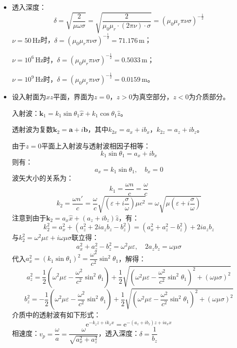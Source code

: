 \documentclass[a4paper,fontset=none]{ctexart}
\begin{document}
\begin{itemize}
    设：
    \[
        \bm{D} = \bm{D}_0\mathrm{e}^{i(\bm{k}\cdot\bm{x}-\omega t)},\quad \bm{E} = \bm{E}_0\mathrm{e}^{i(\bm{k}\cdot\bm{x}-\omega t)}
    \]
    \[
        \bm{B} = \bm{B}_0\mathrm{e}^{i(\bm{k}\cdot\bm{x}-\omega t)},\quad \bm{H} = \bm{H}_0\mathrm{e}^{i(\bm{k}\cdot\bm{x}-\omega t)}
    \]

    \item[7.]
    透入深度：
    \[
        \delta = \sqrt{\frac{2}{\mu\omega\sigma}} = \sqrt{\frac{2}{\mu_0 \mu_r \cdot (2\pi\nu) \cdot \sigma}} = (\mu_0 \mu_r \pi\nu\sigma)^{-\tfrac{1}{2}}
    \]
    $\nu=50\,\mathrm{Hz}$时，$\delta=(\mu_0 \mu_r \pi\nu\sigma)^{-\tfrac{1}{2}}=71.176\,\mathrm{m}$；

    $\nu=10^6\,\mathrm{Hz}$时，$\delta=(\mu_0 \mu_r \pi\nu\sigma)^{-\tfrac{1}{2}}=0.5033\,\mathrm{m}$；

    $\nu=10^9\,\mathrm{Hz}$时，$\delta=(\mu_0 \mu_r \pi\nu\sigma)^{-\tfrac{1}{2}}=0.0159\,\mathrm{m}$。

    \item[8.]
    设入射面为$xz$平面，界面为$z=0$，$z>0$为真空部分，$z<0$为介质部分。

    入射波：$\bm{k}_1=k_1\sin\theta_1\hat{x}+k_1\cos\theta_1\hat{z}$。

    透射波为复数$\bm{k}_2=\bm{a}+i\bm{b}$，其中$k_{2x}=a_x+ib_x$，$k_{2z}=a_z+ib_z$。

    由于$z=0$平面上入射波与透射波相因子相等：
    \[
        k_1\sin\theta_1 = a_x + ib_x
    \]
    则有：
    \[
        a_x = k_1\sin\theta_1,\quad b_x = 0
    \]
    波矢大小的关系为：
    \[
        k_1 = \frac{\omega n}{c} = \frac{\omega}{c}
    \]
    \[
        k_2 = \frac{\omega n'}{c} = \frac{\omega}{c}\sqrt{(\varepsilon+i\frac{\sigma}{\omega})\mu c^2} = \omega\sqrt{\mu(\varepsilon+i\frac{\sigma}{\omega})}
    \]
    注意到由于$\bm{k}_2=a_x\hat{x}+(a_z+ib_z)\hat{z}$，有：
    \[
        k_2^2 = a_x^2 + (a_z^2 + 2ia_z b_z - b_z^2) = (a_x^2 + a_z^2 - b_z^2) + 2ia_z b_z
    \]
    与$k_2^2=\omega^2\mu\varepsilon+i\omega\mu\sigma$联立得：
    \[
        a_x^2 + a_z^2 - b_z^2 = \omega^2\mu\varepsilon,\quad 2a_z b_z = \omega\mu\sigma
    \]
    代入$a_x^2=(k_1\sin\theta_1)^2=\dfrac{\omega^2}{c^2}\sin^2\theta_1$，解得：
    \[
        a_z^2 = \frac{1}{2}(\omega^2\mu\varepsilon-\frac{\omega^2}{c^2}\sin^2\theta_1) + \frac{1}{2}\sqrt{(\omega^2\mu\varepsilon-\frac{\omega^2}{c^2}\sin^2\theta_1)^2+(\omega\mu\sigma)^2}
    \]
    \[
        b_z^2 = -\frac{1}{2}(\omega^2\mu\varepsilon-\frac{\omega^2}{c^2}\sin^2\theta_1) + \frac{1}{2}\sqrt{(\omega^2\mu\varepsilon-\frac{\omega^2}{c^2}\sin^2\theta_1)^2+(\omega\mu\sigma)^2}
    \]
    介质中的透射波有如下形式：
    \[
        \mathrm{e}^{-k_z z+ik_x x}=\mathrm{e}^{-(a_z+ib_z)z+ia_x x}
    \]
    相速度：$v_p=\dfrac{\omega}{a}=\dfrac{\omega}{\sqrt{a_x^2+a_z^2}}$，透入深度：$\delta=\dfrac{1}{b_z}$


\end{itemize}
\end{document}

